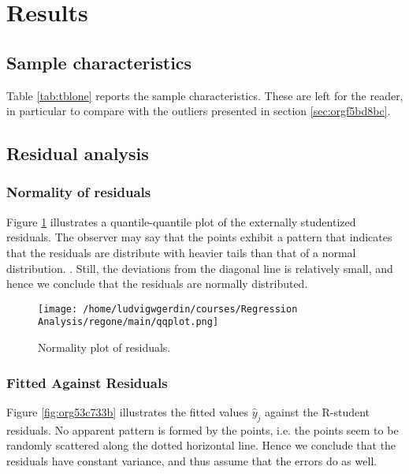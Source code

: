 \documentclass[11pt]{article}
\begin{document}
\newpage
\section{Results}
\label{sec:org50155dd}
\subsection{Sample characteristics}
\label{sec:org8f39d8f}

Table \ref{tab:tblone} reports the sample characteristics. These are left for the reader, in particular to
compare with the outliers presented in section \ref{sec:orgf5bd8bc}.



\subsection{Residual analysis}
\label{sec:org58ca713}
\subsubsection{Normality of residuals}
\label{sec:org9f40da6}

Figure \ref{fig:orgf03d55e} illustrates a quantile-quantile plot of the externally studentized residuals.
The observer may say that the points exhibit a pattern that indicates that the residuals are distribute with
heavier tails than that of a normal distribution. \cite{Montgomery2012}. Still, the deviations from the
diagonal line is relatively small, and hence we conclude that the residuals are normally distributed.

\begin{figure}[htbp]
\centering
\texttt{[image: /home/ludvigwgerdin/courses/Regression Analysis/regone/main/qqplot.png]}
\caption{\label{fig:orgf03d55e}
Normality plot of residuals.}
\end{figure}

\subsubsection{Fitted Against Residuals}
\label{sec:orgd09f6d3}

Figure \ref{fig:org53c733b} illustrates the fitted values \(\hat y_j\) against the R-student residuals. No apparent 
pattern is formed by the points, i.e. the points seem to be randomly scattered along the dotted horizontal
line. Hence we conclude that the residuals have constant variance, and thus assume that the errors do
as well.
\end{document}
